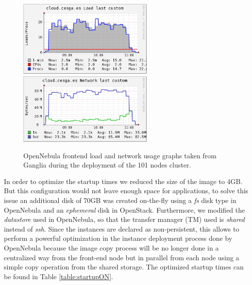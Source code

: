 \begin{figure}[t!]
\centering
\includegraphics[width=0.6\textwidth]{figures/ON_load-complete.png}
\includegraphics[width=0.6\textwidth]{figures/ON_network-complete.png}
\caption{OpenNebula frontend load and network usage graphs taken from Ganglia during the deployment of the 101 nodes cluster.}
\label{fig:on}
\end{figure}


In order to optimize the startup times we reduced the size of the image to 4GB. But this configuration would not leave enough space for applications, to solve this issue an additional disk of 70GB was created on-the-fly using a \emph{fs} disk type in OpenNebula and an \emph{ephemeral} disk in OpenStack. Furthermore, we modified the \emph{datastore} used in OpenNebula, so that the transfer manager (TM) used is \emph{shared} instead of \emph{ssh}. Since the instances are declared as non-persistent, this allows to perform a powerful optimization in the instance deployment process done by OpenNebula because the image copy process will be no longer done in a centralized way from the front-end node but in parallel from each node using a simple copy operation from the shared storage. The optimized startup times can be found in Table \ref{table:startupON}.

